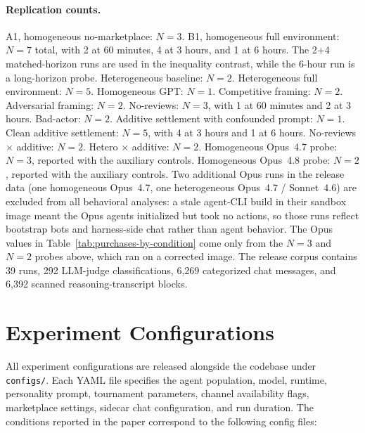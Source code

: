 \documentclass{article}
\begin{document}
\paragraph{Replication counts.}
A1, homogeneous no-marketplace: $N{=}3$.
B1, homogeneous full environment: $N{=}7$ total, with 2 at 60 minutes, 4 at 3 hours, and 1 at 6 hours.
The 2+4 matched-horizon runs are used in the inequality contrast, while the 6-hour run is a long-horizon probe.
Heterogeneous baseline: $N{=}2$.
Heterogeneous full environment: $N{=}5$.
Homogeneous GPT: $N{=}1$.
Competitive framing: $N{=}2$.
Adversarial framing: $N{=}2$.
No-reviews: $N{=}3$, with 1 at 60 minutes and 2 at 3 hours.
Bad-actor: $N{=}2$.
Additive settlement with confounded prompt: $N{=}1$.
Clean additive settlement: $N{=}5$, with 4 at 3 hours and 1 at 6 hours.
No-reviews $\times$ additive: $N{=}2$.
Hetero $\times$ additive: $N{=}2$.
Homogeneous Opus~4.7 probe: $N{=}3$, reported with the auxiliary controls.
Homogeneous Opus~4.8 probe: $N{=}2$, reported with the auxiliary controls.
Two additional Opus runs in the release data (one homogeneous Opus~4.7, one heterogeneous Opus~4.7 / Sonnet~4.6) are excluded from all behavioral analyses: a stale agent-CLI build in their sandbox image meant the Opus agents initialized but took no actions, so those runs reflect bootstrap bots and harness-side chat rather than agent behavior. The Opus values in Table~\ref{tab:purchases-by-condition} come only from the $N{=}3$ and $N{=}2$ probes above, which ran on a corrected image.
The release corpus contains 39 runs, 292 LLM-judge classifications, 6{,}269 categorized chat messages, and 6{,}392 scanned reasoning-transcript blocks.

\section{Experiment Configurations}
\label{app:configs}

All experiment configurations are released alongside the codebase under \texttt{configs/}.
Each YAML file specifies the agent population, model, runtime, personality prompt, tournament parameters, channel availability flags, marketplace settings, sidecar chat configuration, and run duration.
The conditions reported in the paper correspond to the following config files:
\end{document}

